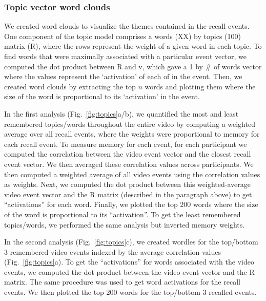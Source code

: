 \documentclass{article}
\begin{document}
{%

\subsubsection{Topic vector word clouds}
 We created word clouds to visualize the themes contained in the recall events. One component of the topic model comprises a words (XX) by topics (100) matrix (R), where the rows represent the weight of a given word in each topic.  To find words that were maximally associated with a particular event vector, we computed the dot product between R and v, which gave a 1 by \# of words vector where the values represent the `activation' of each of in the event. Then, we created word clouds by extracting the top $n$ words and plotting them where the size of the word is proportional to its `activation' in the event.

In the first analysis (Fig.~\ref{fig:topics}a/b), we quantified the most and least remembered topics/words throughout the entire video by computing a weighted average over all recall events, where the weights were proportional to memory for each recall event. To measure memory for each event, for each participant we computed the correlation between the video event vector and the closest recall event vector. We then averaged these correlation values across participants. We then computed a weighted average of all video events using the correlation values as weights. Next, we computed the dot product between this weighted-average video event vector and the R matrix (described in the paragraph above) to get ``activations'' for each word. Finally, we plotted the top 200 words where the size of the word is proportional to its ``activation''. To get the least remembered topics/words, we performed the same analysis but inverted memory weights.

In the second analysis (Fig.~\ref{fig:topics}c), we created wordles for the top/bottom 3 remembered video events indexed by the average correlation values (Fig.~\ref{fig:topics}a).  To get the ``activations'' for words associated with the video events, we computed the dot product between the video event vector and the R matrix. The same procedure was used to get word activations for the recall events. We then plotted the top 200 words for the top/bottom 3 recalled events.

}
\end{document}
